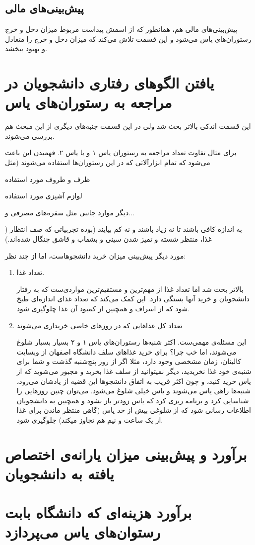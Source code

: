 \documentclass{article}
\begin{document}
	    \subsection{پیش‌بینی‌های مالی}
	    	پیش‌بینی‌های مالی هم، همانطور که از اسمش پیداست مربوط میزان دخل و خرج رستوران‌های یاس می‌شود و این قسمت تلاش می‌کند که میزان دخل و خرج را متعادل و بهبود ببخشد.
	    	
	\section{یافتن الگو‌های رفتاری دانشجویان در مراجعه به رستوران‌های یاس}
		این قسمت اندکی بالاتر بحث شد ولی در این قسمت جنبه‌های دیگری از این مبحث هم بررسی می‌شوند.
		
		برای مثال تفاوت تعداد مراجعه‌ به رستوران یاس ۱ و یا یاس ۲. فهمیدن این باعث می‌شود که تمام ابزار‌آلاتی که در این رستوران‌‌ها استفاده می‌شوند (مثل
		\begin{enumerate*}
			\item ظرف و طروف مورد استفاده
			\item لوازم آشپزی مورد استفاده 
			\item دیگر موارد جانبی مثل سفره‌های مصرفی و...
		\end{enumerate*})
	به اندازه کافی باشند تا نه زیاد باشند و نه کم بیایند (بوده تجربیاتی که صف انتظار غذا، منتظر شسته و تمیز شدن سینی و بشقاب و قاشق چنگال شده‌اند.)
	
	مورد دیگر پیش‌بینی میزان خرید دانشجو‌هاست، اما از چند نظر:
	\begin{enumerate}
		\item 
		تعداد غذا.
		
		بالاتر بحث شد اما تعداد غذا از مهم‌ترین و مستقیم‌ترین مواردی‌ست که به رفتار دانشجویان و خرید آنها بستگی دارد. این کمک می‌کند که تعداد غذای اندازه‌ای طبخ شود که از اسراف و همچنین از کمبود آن غذا چلوگیری شود.
		
		\item تعداد کل غذاهایی که در روز‌های خاصی خریداری می‌شوند
		
		این مسئله‌ی مهمی‌ست. اکثر شنبه‌ها رستوران‌های یاس ۱ و ۲ بسیار بسیار شلوغ می‌شوند، اما خب چرا؟
		برای خرید غذاهای سلف دانشگاه اصفهان از وبسایت کالینان، زمان مشخصی وجود دارد، مثلا اگر از روز پنچ‌شنبه گذشت و شما برای شنبه‌ی خود غذا نخریدید، دیگر نمیتوانید از سلف غذا بخرید و مجبور می‌شوید که از یاس خرید کنید، و چون اکثر قریب به اتفاق دانشجو‌‌ها این قضیه از یادشان می‌رود، شنبه‌ها راهی یاس می‌شوند و یاس خیلی شلوغ می‌شود. می‌توان چنین روز‌هایی را شناسایی کرد و برنامه ریزی کرد که یاس زودتر باز بشود و همچنین به دانشجویان اطلاعات رسانی شود که از شلوغی بیش از حد یاس (گاهی منتظر ماندن برای غذا از یک ساعت و نیم هم تجاوز میکند) جلوگیری شود.
	\end{enumerate}
	
	\section{برآورد و پیش‌بینی میزان یارانه‌ی اختصاص یافته‌ به دانشجویان}
	
	\section{برآورد هزینه‌ای که دانشگاه بابت رستوان‌های یاس می‌پردازد}
\end{document}
